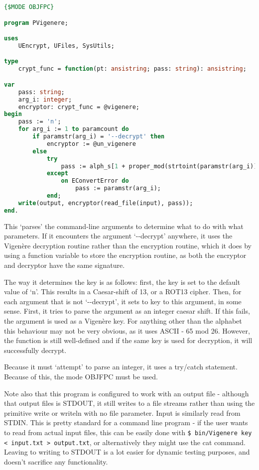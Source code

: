 \documentclass{article}
\begin{document}
\begin{lstlisting}[language=Pascal, caption=Command-line interface for Vigen\`ere routines (PVigenere.pas)]
{$MODE OBJFPC}

program PVigenere;

uses
    UEncrypt, UFiles, SysUtils;

type
    crypt_func = function(pt: ansistring; pass: string): ansistring;

var
    pass: string;
    arg_i: integer;
    encryptor: crypt_func = @vigenere;
begin
    pass := 'n';
    for arg_i := 1 to paramcount do
        if paramstr(arg_i) = '--decrypt' then
            encryptor := @un_vigenere
        else
            try
                pass := alph_s[1 + proper_mod(strtoint(paramstr(arg_i)), 26)];
            except
                on EConvertError do
                    pass := paramstr(arg_i);
            end;
    write(output, encryptor(read_file(input), pass));
end.
\end{lstlisting}
\iffalse $ \fi %

    This `parses' the command-line arguments to determine what to do with what
    parameters. If it encounters the argument `-{}-decrypt' anywhere, it uses the
    Vigen\`ere decryption routine rather than the encryption routine, which it
    does by using a function variable to store the encryption routine, as both
    the encryptor and decryptor have the same signature.

    The way it determines the key is as follows: first, the key is set to the
    default value of `n'. This results in a Caesar-shift of 13, or a ROT13
    cipher. Then, for each argument that is not `-{}-decrypt', it sets to key to
    this argument, in some sense. First, it tries to parse the argument as an
    integer caesar shift. If this fails, the argument is used as a Vigen\`ere
    key. For anything other than the alphabet this behaviour may not be very
    obvious, as it uses ASCII - 65 mod 26. However, the function is still
    well-defined and if the same key is used for decryption, it will
    successfully decrypt.

    Because it must `attempt' to parse an integer, it uses a try/catch
    statement. Because of this, the mode OBJFPC must be used.

    Note also that this program is configured to work with an output file -
    although that output files is STDOUT, it still writes to a file streams
    rather than using the primitive write or writeln with no file parameter.
    Input is similarly read from STDIN. This is pretty standard for a command
    line program - if the user wants to read from actual input files, this can
    be easily done with \verb|$ bin/Vigenere key < input.txt > output.txt|, or
    alternatively they might use the cat command. Leaving to writing to STDOUT
    is a lot easier for dynamic testing purposes, and doesn't sacrifice any
    functionality.
\end{document}
